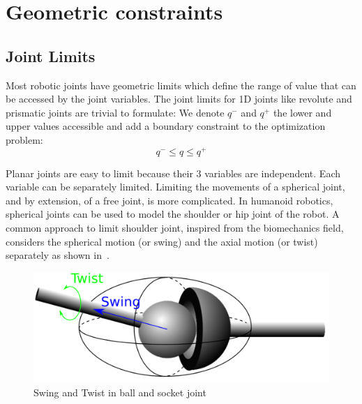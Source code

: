 \section{Geometric constraints}
\label{sec:geometric_constraints}


\subsection{Joint Limits}
\label{sub:joint_limits}


Most robotic joints have geometric limits which define the range of value that can be accessed by the joint variables.
The joint limits for 1D joints like revolute and prismatic joints are trivial to formulate: We denote $q^-$ and $q^+$ the lower and upper values accessible and add a boundary constraint to the optimization problem:
\begin{equation}
\label{eq:joint_limits}
  \boxed{q^- \leq q \leq q^+}
\end{equation}

Planar joints are easy to limit because their 3 variables are independent.
Each variable can be separately limited.
Limiting the movements of a spherical joint, and by extension, of a free joint, is more complicated.
In humanoid robotics, spherical joints can be used to model the shoulder or hip joint of the robot.
A common approach to limit shoulder joint, inspired from the biomechanics field, considers the spherical motion (or swing) and the axial motion (or twist) separately as shown in~.

\begin{figure}[htpb]
  \centering
  \includegraphics[width=0.7\linewidth]{ballAndSocket.pdf}
  \caption{Swing and Twist in ball and socket joint}
\label{fig:ballAndSocket}
\end{figure}

